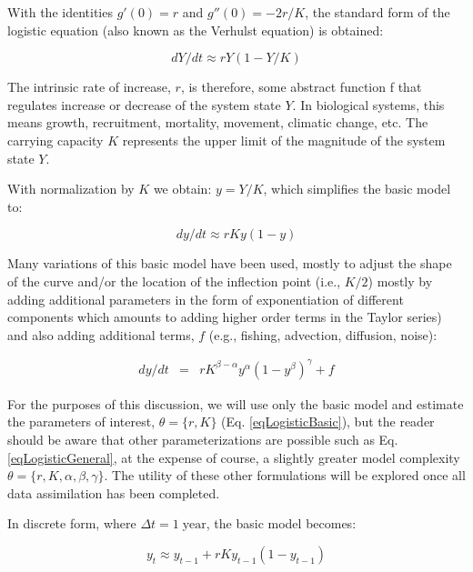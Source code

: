 \documentclass[letterpaper,portrait,11pt]{scrartcl}
\numberwithin{equation}{section}		%
\numberwithin{figure}{section}		%
\numberwithin{table}{section}				%
\begin{document}
With the identities $g'(0) = r$  and $g''(0) = - 2r/K$, the standard form of the logistic equation (also known as the Verhulst equation) is obtained:

\begin{equation} 
\label{eqLogistic}
dY/dt \approx r Y (1 - Y/K)
\end{equation}

The intrinsic rate of increase, $r$, is therefore, some abstract function f that regulates increase or decrease of the system state $Y$. In biological systems, this means growth, recruitment, mortality,  movement, climatic change, etc. The carrying capacity $K$ represents the upper limit of the magnitude of the system state $Y$.

With normalization by $K$ we obtain: $ y = Y/K $, which simplifies the basic model to:

\begin{equation} 
\label{eqLogisticBasic}
dy/dt  \approx  r K y (1 - y)
\end{equation}

Many variations of this basic model have been used, mostly to adjust the shape of the curve and/or the location of the inflection point (i.e., $K/2$) mostly by adding additional parameters in the form of exponentiation of different components which amounts to adding higher order terms in the Taylor series) and also adding additional terms, $f$ (e.g., fishing, advection, diffusion, noise): 

\begin{eqnarray} 
\label{eqLogisticGeneral}
dy / dt &=& rK^{\beta-\alpha} y^{\alpha} ( 1 - y^{\beta} )^{\gamma} + f 
\end{eqnarray}

For the purposes of this discussion, we will use only the basic model and estimate the parameters of interest, $\theta = \{r, K \}$ (Eq. \ref{eqLogisticBasic}), but the reader should be aware that other parameterizations are possible such as Eq. \ref{eqLogisticGeneral}, at the expense of course, a slightly greater model complexity $\theta=\{r,K,\alpha,\beta,\gamma\}$. The utility of these other formulations will be explored once all data assimilation has been completed. 

In discrete form, where $\Delta t = 1 \; \text{year}$, the basic model becomes:

\begin{equation} 
\label{eqLogisticDiscrete}
y_t  \approx y_{t-1} + r K y_{t-1} (1 - y_{t-1} )
\end{equation}
\end{document}
